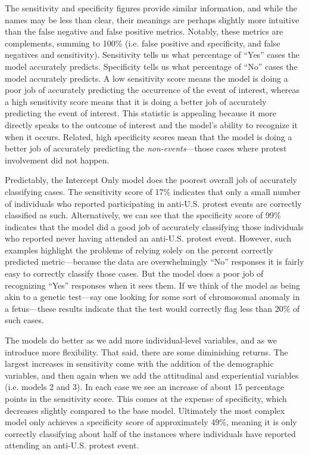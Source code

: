 The sensitivity and specificity figures provide similar information, and while the names may be less than clear, their meanings are perhaps slightly more intuitive than the false negative and false positive metrics. Notably, these metrics are complements, summing to 100\% (i.e. false positive and specificity, and false negatives and sensitivity). Sensitivity tells us what percentage of ``Yes'' cases the model accurately predicts. Specificity tells us what percentage of ``No'' cases the model accurately predicts. A low sensitivity score means the model is doing a poor job of accurately predicting the occurrence of the event of interest, whereas a high sensitivity score means that it is doing a better job of accurately predicting the event of interest. This statistic is appealing because it more directly speaks to the outcome of interest and the model's ability to recognize it when it occurs. Related, high specificity scores mean that the model is doing a better job of accurately predicting the \emph{non-events}---those cases where protest involvement did not happen. 

Predictably, the Intercept Only model does the poorest overall job of accurately classifying cases. The sensitivity score of 17\% indicates that only a small number of individuals who reported participating in anti-U.S. protest events are correctly classified as such. Alternatively, we can see that the specificity score of 99\% indicates that the model did a good job of accurately classifying those individuals who reported never having attended an anti-U.S. protest event. However, such examples highlight the problems of relying solely on the percent correctly predicted metric---because the data are overwhelmingly ``No'' responses it is fairly easy to correctly classify those cases. But the model does a poor job of recognizing ``Yes'' responses when it sees them. If we think of the model as being akin to a genetic test---say one looking for some sort of chromosomal anomaly in a fetus---these results indicate that the test would correctly flag less than 20\% of such cases.

The models do better as we add more individual-level variables, and as we introduce more flexibility. That said, there are some diminishing returns. The largest increases in sensitivity come with the addition of the demographic variables, and then again when we add the attitudinal and experiential variables (i.e. models 2 and 3). In each case we see an increase of about 15 percentage points in the sensitivity score. This comes at the expense of specificity, which decreases slightly compared to the base model. Ultimately the most complex model only achieves a specificity score of approximately 49\%, meaning it is only correctly classifying about half of the instances where individuals have reported attending an anti-U.S. protest event.

